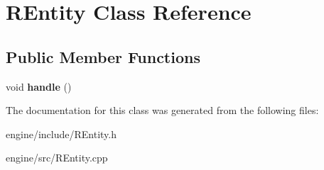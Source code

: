 \hypertarget{classREntity}{
\section{REntity Class Reference}
\label{classREntity}
}
\subsection*{Public Member Functions}
\begin{DoxyCompactItemize}
\item 
\hypertarget{classREntity_a1a584b097fc46b6441f214cf99221b07}{
void {\bfseries handle} ()}
\label{classREntity_a1a584b097fc46b6441f214cf99221b07}

\end{DoxyCompactItemize}


The documentation for this class was generated from the following files:\begin{DoxyCompactItemize}
\item 
engine/include/REntity.h\item 
engine/src/REntity.cpp\end{DoxyCompactItemize}
